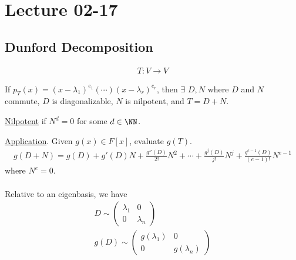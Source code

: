 \documentclass[class=scrartcl, crop=false]{standalone}
\date{2020-02-17}
\begin{document}
\section{Lecture 02-17}

\subsection{Dunford Decomposition}

\begin{gather*}
  T: V \to V
\end{gather*} 

If $p_T(x) = (x - \lambda_1)^{e_1}(\cdots)(x - \lambda_r)^{e_r}$, then $\exists$ $D, N$ where $D$ and  $N$ commute, $D$ is diagonalizable, $N$ is nilpotent, and $T = D + N$.
\begin{definition}[Nilpotent]
  \ul{Nilpotent} if $N^d = 0$ for some $d \in \NN$.
\end{definition} 

\ul{Application}. Given $g(x) \in F[x]$, evaluate $g(T)$.
\begin{gather*}
  g(D + N) = g(D) + g'(D)N + \frac{g''(D)}{2!}N^2 + \cdots + \frac{g^j(D)}{j!}N^j + \frac{g^{e - 1}(D)}{(e - 1)!}N^{e - 1}
\end{gather*} 
where $N^e = 0$.
\\\\
Relative to an eigenbasis, we have 
\begin{gather*}
  D \sim
  \begin{pmatrix}
    \lambda_1 & 0 \\
    0 & \lambda_n
  \end{pmatrix} 
  \\
  g(D) \sim
  \begin{pmatrix}
    g(\lambda_1) & 0 \\
    0 & g(\lambda_n)
  \end{pmatrix} 
\end{gather*} 
\end{document}

